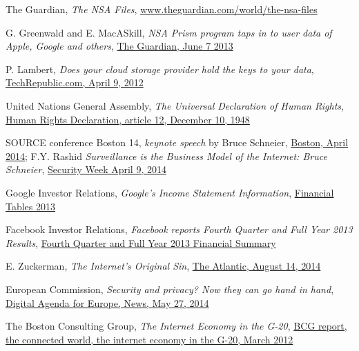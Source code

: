 \documentclass[twocolumn,english]{article}
\begin{document}
\begin{thebibliography}{9}
 The Guardian, \emph{The NSA Files}, \href{http://www.theguardian.com/world/the-nsa-files}{www.theguardian.com/world/the-nsa-files}

 G. Greenwald and E. MacASkill, \emph{NSA Prism program taps in to user data of Apple, Google and others}, \href{http://www.theguardian.com/world/2013/jun/06/us-tech-giants-nsa-data}{The Guardian, June 7 2013}

 P. Lambert, \emph{Does your cloud storage provider hold the keys to your data}, \href{http://www.techrepublic.com/blog/it-security/does-your-cloud-storage-provider-hold-the-keys-to-your-data}{TechRepublic.com, April 9, 2012}

 United Nations General Assembly, \emph{The Universal Declaration of Human Rights}, \href{http://www.un.org/en/documents/udhr/}{Human Rights Declaration, article 12, December 10, 1948}

 SOURCE conference Boston 14, \emph{keynote speech} by Bruce Schneier, \href{http://sourceconference.com/boston/}{Boston, April 2014}; F.Y. Rashid \emph{Surveillance is the Business Model of the Internet: Bruce Schneier}, \href{http://www.securityweek.com/surveillance-business-model-internet-bruce-schneier}{Security Week April 9, 2014}

 Google Investor Relations, \emph{Google's Income Statement Information}, \href{https://investor.google.com/financial/2013/tables.html}{Financial Tables 2013}

 Facebook Investor Relations, \emph{Facebook reports Fourth Quarter and Full Year 2013 Results}, \href{http://investor.fb.com/releasedetail.cfm?ReleaseID=821954}{Fourth Quarter and Full Year 2013 Financial Summary}

 E. Zuckerman, \emph{The Internet's Original Sin}, \href{http://www.theatlantic.com/technology/archive/2014/08/advertising-is-the-internets-original-sin/376041/}{The Atlantic, August 14, 2014}

 European Commission, \emph{Security and privacy? Now they can go hand in hand}, \href{https://ec.europa.eu/digital-agenda/en/news/security-and-privacy-now-they-can-go-hand-hand}{Digital Agenda for Europe, News, May 27, 2014}

 The Boston Consulting Group, \emph{The Internet Economy in the G-20}, \href{https://www.bcg.com/documents/file100409.pdf}{BCG report, the connected world, the internet economy in the G-20, March 2012}


\end{thebibliography}
\end{document}
